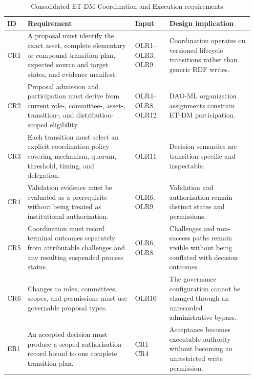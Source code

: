 \documentclass[journal]{IEEEtran}
\begin{document}
\begin{table}[t]
\caption{Consolidated ET-DM Coordination and Execution requirements}
\label{tab:coord_exec_requirements}
\centering
\renewcommand{\arraystretch}{1.12}
\setlength{\tabcolsep}{4pt}
\begin{tabular}{p{1.0cm}p{6.2cm}p{2.1cm}p{6.9cm}}
\hline
\textbf{ID} &
\textbf{Requirement} &
\textbf{Input} &
\textbf{Design implication}\\
\hline

CR1 &
A proposal must identify the exact asset, complete elementary
or compound transition plan, expected source and target states,
and evidence manifest. &
OLR1--OLR3, OLR9 &
Coordination operates on versioned lifecycle transitions
rather than generic RDF writes.\\

CR2 &
Proposal admission and participation must derive from current
role-, committee-, asset-, transition-, and distribution-scoped
eligibility. &
OLR4--OLR8, OLR12 &
DAO-ML organization assignments constrain ET-DM participation.\\

CR3 &
Each transition must select an explicit coordination policy
covering mechanism, quorum, threshold, timing, and delegation. &
OLR11 &
Decision semantics are transition-specific and inspectable.\\

CR4 &
Validation evidence must be evaluated as a prerequisite
without being treated as institutional authorization. &
OLR6, OLR9 &
Validation and authorization remain distinct states
and permissions.\\

CR5 &
Coordination must record terminal outcomes separately
from attributable challenges and any resulting suspended
process status. &
OLR6, OLR8 &
Challenges and non-success paths remain visible without
being conflated with decision outcomes.\\

CR6 &
Changes to roles, committees, scopes, and permissions
must use governable proposal types. &
OLR10 &
The governance configuration cannot be changed through
an unrecorded administrative bypass.\\

ER1 &
An accepted decision must produce a scoped authorization
record bound to one complete transition plan. &
CR1--CR4 &
Acceptance becomes executable authority without becoming
an unrestricted write permission.\\


\end{tabular}
\end{table}
\end{document}
